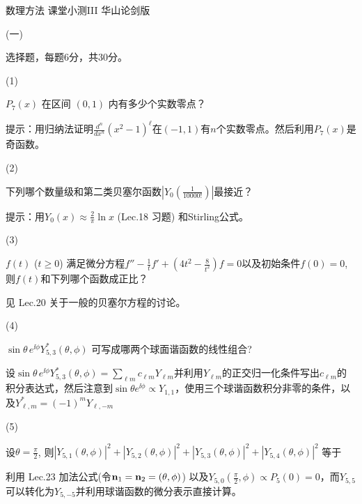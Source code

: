 \documentclass[12pt,CJK]{article}
\begin{document}
\bch
{\large 数理方法 课堂小测III 华山论剑版}

{\vskip 0.2in}

\bitem
\item[(一)]{选择题，每题6分，共30分。

  \bitem


\item[(1)]{$P_{7}(x)$ 在区间 $(0,1)$ 内有多少个实数零点？ 


{\red 提示：用归纳法证明$\frac{d^n}{dx^n}(x^2-1)^\ell$在$(-1,1)$有$n$个实数零点。然后利用$P_7(x)$是奇函数。 }}
  
\item[(2)]{ 下列哪个数量级和第二类贝塞尔函数$|Y_0\left(\frac{1}{10000!}\right)|$最接近？ 
  

{\red 提示：用$Y_0(x)\approx \frac{2}{\pi} \ln x $ (Lec.18 习题) 和Stirling公式。}}

\item[(3)]{$f(t)$ ($t\ge 0$) 满足微分方程$f''-\frac{1}{t}f'+(4t^2-\frac{8}{t^2})f =0$以及初始条件$f(0) = 0$, 则$f(t)$和下列哪个函数成正比？ 

  
{\red 见 Lec.20 关于一般的贝塞尔方程的讨论。}
}

\item[(4)]{$\sin\theta\,e^{\ii \phi} Y_{5,3}^*(\theta,\phi)$ 可写成哪两个球面谐函数的线性组合? 
  

{\red 设$\sin\theta\,e^{\ii \phi} Y_{5,3}^*(\theta,\phi) = \sum_{\ell m}c_{\ell m}Y_{\ell m}$并利用$Y_{\ell m}$的正交归一化条件写出$c_{\ell m}$的积分表达式，然后注意到$\sin\theta e^{\ii \phi}\propto Y_{1,1}$，使用三个球谐函数积分非零的条件，以及$Y_{\ell, m}^*=(-1)^mY_{\ell,- m}$}
}
  
\item[(5)]{ 设$\theta = \frac{\pi}{2}$, 则$|Y_{5, 1}(\theta,\phi)|^2+  |Y_{5, 2}(\theta,\phi)|^2+ |Y_{5, 3}(\theta,\phi)|^2+|Y_{5, 4}(\theta,\phi)|^2$ 等于 
  

{\red 利用 Lec.23 加法公式(令${\mathbf{n}}_1={\mathbf{n}}_2=(\theta,\phi)$) 以及$Y_{5,0}(\frac{\pi}{2},\phi)\propto P_5(0) = 0$，而$Y_{5,5}$可以转化为$Y_{5,-5}$并利用球谐函数的微分表示直接计算。}}

\eitem  
}
\end{document}
